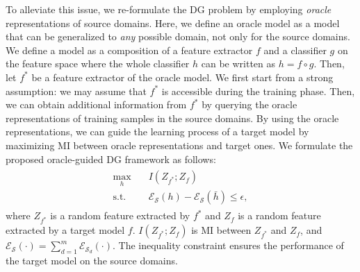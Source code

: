 To alleviate this issue, we re-formulate the DG problem by employing \emph{oracle} representations of source domains. Here, we define an oracle model as a model that can be generalized to \emph{any} possible domain, not only for the source domains.
We define a model as a composition of a feature extractor $f$ and a classifier $g$ on the feature space where the whole classifier $h$ can be written as $h=f\circ g$.
Then, let $f^{*}$ be a feature extractor of the oracle model.
We first start from a strong assumption: 
we may assume that $f^*$ is accessible during the training phase. Then, we can obtain additional information from $f^{*}$ by querying the oracle representations of training samples in the source domains.
By using the oracle representations, we can guide the learning process of a target model by maximizing MI between oracle representations and target ones.
We formulate the proposed oracle-guided DG framework as follows:
\begin{align}
\begin{split} %
    \max_{h} \quad & I(Z_{f^\mathfrak{*}};Z_{f}) \\
    \textrm{s.t.} \quad & \mathcal{E}_{\mathcal S}(h) - \mathcal{E}_{\mathcal S}(\bar{h}) \leq \epsilon,
\end{split}
\label{eq:obj_constrained_mother}
\end{align}
where $Z_{f^{*}}$ is a random feature extracted by $f^{*}$ and $Z_{f}$ is a random feature extracted by a target model $f$. $I(Z_{f^{*}};Z_{f})$ is MI between $Z_{f^{*}}$ and $Z_{f}$, and $\mathcal{E}_{\mathcal S}(\cdot) = \sum_{d=1}^{m}\mathcal{E}_{\mathcal{S}_{d}}(\cdot)$.
The inequality constraint ensures the performance of the target model on the source domains.
